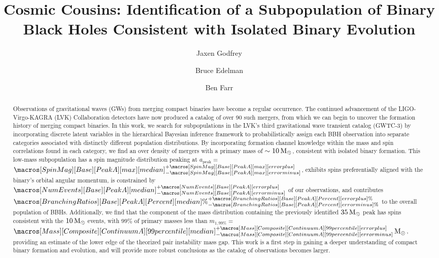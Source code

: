 \documentclass[twocolumn]{aastex631}
\newcommand{\CIPlusMinus}[1]{{#1[median]^{+#1[error plus]}_{-#1[error minus]}}}
\newcommand{\CIPlusMinusPer}[1]{{#1[median]\%^{+#1[error plus]\%}_{-#1[error minus]\%}}}
\newcommand{\msun}{\ensuremath{{\,\rm M}_\odot}}
\newcommand{\result}[1]{#1}
\begin{document}
\title{Cosmic Cousins: Identification of a Subpopulation of Binary Black Holes Consistent with Isolated Binary Evolution}

\author{Jaxen Godfrey}
\author{Bruce Edelman}
\author{Ben Farr}

\begin{abstract}
    Observations of gravitational waves (GWs) from merging compact binaries have become a regular occurrence. The continued advancement of the LIGO-Virgo-KAGRA (LVK) Collaboration detectors have now produced a catalog of over 90 such mergers, from which we can begin to uncover the formation history of merging compact binaries. In this work, we search for subpopulations in the LVK's third gravitational wave transient catalog (GWTC-3) by incorporating discrete latent variables in the hierarchical Bayesian inference framework to probabilistically assign each BBH observation into separate categories associated with distinctly different population distributions. By incorporating formation channel knowledge within the mass and spin correlations found in each category, we find an over density of mergers with a primary mass of $\sim10\msun$, consistent with isolated binary formation. This low-mass subpopulation has a spin magnitude distribution peaking at $a_\mathrm{peak}=$ \result{$\CIPlusMinus{\macros[SpinMag][Base][PeakA][max]}$}, exhibits spins preferentially aligned with the binary's orbital angular momentum, is constrained by \result{$\CIPlusMinus{\macros[NumEvents][Base][PeakA]}$} of our observations, and contributes \result{$\CIPlusMinusPer{\macros[BranchingRatios][Base][PeakA][Percent]}$} to the overall population of BBHs. Additionally, we find that the component of the mass distribution containing the previously identified $35\msun$ peak has spins consistent with the $10\msun$ events, with $99\%$ of primary masses less than $m_{1,99\%} = $ \result{$\CIPlusMinus{\macros[Mass][Composite][ContinuumA][99percentile]}\msun$}, providing an estimate of the lower edge of the theorized pair instability mass gap. This work is a first step in gaining a deeper understanding of compact binary formation and evolution, and will provide more robust conclusions as the catalog of observations becomes larger. 
\end{abstract}
\end{document}
